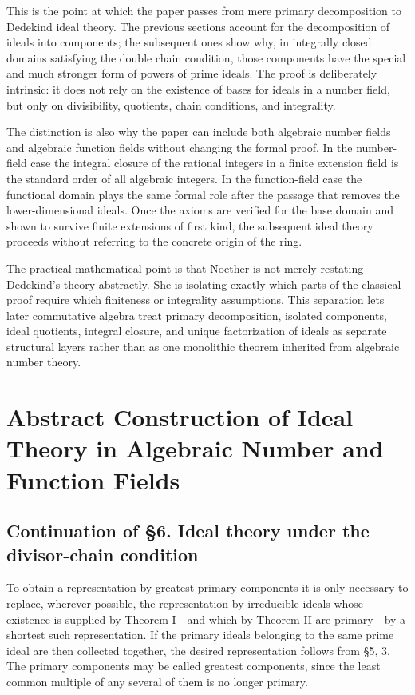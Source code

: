 \documentclass[11pt]{article}
\begin{document}
This is the point at which the paper passes from mere primary decomposition to Dedekind ideal theory. The previous sections account for the decomposition of ideals into components; the subsequent ones show why, in integrally closed domains satisfying the double chain condition, those components have the special and much stronger form of powers of prime ideals. The proof is deliberately intrinsic: it does not rely on the existence of bases for ideals in a number field, but only on divisibility, quotients, chain conditions, and integrality.

The distinction is also why the paper can include both algebraic number fields and algebraic function fields without changing the formal proof. In the number-field case the integral closure of the rational integers in a finite extension field is the standard order of all algebraic integers. In the function-field case the functional domain plays the same formal role after the passage that removes the lower-dimensional ideals. Once the axioms are verified for the base domain and shown to survive finite extensions of first kind, the subsequent ideal theory proceeds without referring to the concrete origin of the ring.

The practical mathematical point is that Noether is not merely restating Dedekind's theory abstractly. She is isolating exactly which parts of the classical proof require which finiteness or integrality assumptions. This separation lets later commutative algebra treat primary decomposition, isolated components, ideal quotients, integral closure, and unique factorization of ideals as separate structural layers rather than as one monolithic theorem inherited from algebraic number theory.

\clearpage

\section{Abstract Construction of Ideal Theory in Algebraic Number and
Function
Fields}\label{abstract-construction-of-ideal-theory-in-algebraic-number-and-function-fields}

\subsection{Continuation of §6. Ideal theory under the divisor-chain
condition}\label{continuation-of-6.-ideal-theory-under-the-divisor-chain-condition}

To obtain a representation by greatest primary components it is only
necessary to replace, wherever possible, the representation by
irreducible ideals whose existence is supplied by Theorem I - and which
by Theorem II are primary - by a shortest such representation. If the
primary ideals belonging to the same prime ideal are then collected
together, the desired representation follows from §5, 3. The primary
components may be called greatest components, since the least common
multiple of any several of them is no longer primary.
\end{document}
